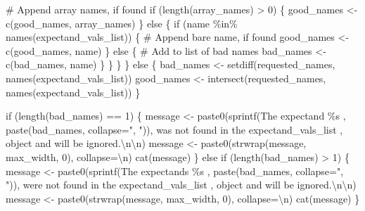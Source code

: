 \documentclass[
  letterpaper,
  DIV=11,
  numbers=noendperiod]{scrartcl}
\newenvironment{Shaded}{\begin{snugshade}}{\end{snugshade}}
\newcommand{\CharTok}[1]{\textcolor[rgb]{0.13,0.47,0.30}{#1}}
\newcommand{\CommentTok}[1]{\textcolor[rgb]{0.37,0.37,0.37}{#1}}
\newcommand{\ControlFlowTok}[1]{\textcolor[rgb]{0.00,0.23,0.31}{#1}}
\newcommand{\DecValTok}[1]{\textcolor[rgb]{0.68,0.00,0.00}{#1}}
\newcommand{\KeywordTok}[1]{\textcolor[rgb]{0.00,0.23,0.31}{#1}}
\newcommand{\NormalTok}[1]{\textcolor[rgb]{0.00,0.23,0.31}{#1}}
\newcommand{\OperatorTok}[1]{\textcolor[rgb]{0.37,0.37,0.37}{#1}}
\newcommand{\SpecialCharTok}[1]{\textcolor[rgb]{0.37,0.37,0.37}{#1}}
\newcommand{\StringTok}[1]{\textcolor[rgb]{0.13,0.47,0.30}{#1}}
\begin{document}
\begin{Shaded}
\begin{Highlighting}[]
      \CommentTok{\# Append array names, if found}
      \ControlFlowTok{if}\NormalTok{ (length(array\_names) }\OperatorTok{\textgreater{}} \DecValTok{0}\NormalTok{) \{}
\NormalTok{        good\_names }\OperatorTok{\textless{}{-}}\NormalTok{ c(good\_names, array\_names)}
\NormalTok{      \} }\ControlFlowTok{else}\NormalTok{ \{}
        \ControlFlowTok{if}\NormalTok{ (name }\OperatorTok{\%}\KeywordTok{in}\OperatorTok{\%}\NormalTok{ names(expectand\_vals\_list)) \{}
          \CommentTok{\# Append bare name, if found}
\NormalTok{          good\_names }\OperatorTok{\textless{}{-}}\NormalTok{ c(good\_names, name)}
\NormalTok{        \}  }\ControlFlowTok{else}\NormalTok{ \{}
          \CommentTok{\# Add to list of bad names}
\NormalTok{          bad\_names }\OperatorTok{\textless{}{-}}\NormalTok{ c(bad\_names, name)}
\NormalTok{        \}}
\NormalTok{      \}}
\NormalTok{    \}}
\NormalTok{  \} }\ControlFlowTok{else}\NormalTok{ \{}
\NormalTok{    bad\_names }\OperatorTok{\textless{}{-}}\NormalTok{ setdiff(requested\_names, names(expectand\_vals\_list))}
\NormalTok{    good\_names }\OperatorTok{\textless{}{-}}\NormalTok{ intersect(requested\_names, names(expectand\_vals\_list))}
\NormalTok{  \}}
    
  \ControlFlowTok{if}\NormalTok{ (length(bad\_names) }\OperatorTok{==} \DecValTok{1}\NormalTok{) \{}
\NormalTok{    message }\OperatorTok{\textless{}{-}}\NormalTok{ paste0(sprintf(}\StringTok{\textquotesingle{}The expectand }\SpecialCharTok{\%s}\StringTok{ \textquotesingle{}}\NormalTok{,}
\NormalTok{                              paste(bad\_names, collapse}\OperatorTok{=}\StringTok{", "}\NormalTok{)),}
                      \StringTok{\textquotesingle{}was not found in the expectand\_vals\_list \textquotesingle{}}\NormalTok{,}
                      \StringTok{\textquotesingle{}object and will be ignored.}\CharTok{\textbackslash{}n\textbackslash{}n}\StringTok{\textquotesingle{}}\NormalTok{)}
\NormalTok{    message }\OperatorTok{\textless{}{-}}\NormalTok{ paste0(strwrap(message, max\_width, }\DecValTok{0}\NormalTok{), collapse}\OperatorTok{=}\StringTok{\textquotesingle{}}\CharTok{\textbackslash{}n}\StringTok{\textquotesingle{}}\NormalTok{)}
\NormalTok{    cat(message)}
\NormalTok{  \} }\ControlFlowTok{else} \ControlFlowTok{if}\NormalTok{ (length(bad\_names) }\OperatorTok{\textgreater{}} \DecValTok{1}\NormalTok{) \{}
\NormalTok{    message }\OperatorTok{\textless{}{-}}\NormalTok{ paste0(sprintf(}\StringTok{\textquotesingle{}The expectands }\SpecialCharTok{\%s}\StringTok{ \textquotesingle{}}\NormalTok{,}
\NormalTok{                              paste(bad\_names, collapse}\OperatorTok{=}\StringTok{", "}\NormalTok{)),}
                      \StringTok{\textquotesingle{}were not found in the expectand\_vals\_list \textquotesingle{}}\NormalTok{,}
                      \StringTok{\textquotesingle{}object and will be ignored.}\CharTok{\textbackslash{}n\textbackslash{}n}\StringTok{\textquotesingle{}}\NormalTok{)}
\NormalTok{    message }\OperatorTok{\textless{}{-}}\NormalTok{ paste0(strwrap(message, max\_width, }\DecValTok{0}\NormalTok{), collapse}\OperatorTok{=}\StringTok{\textquotesingle{}}\CharTok{\textbackslash{}n}\StringTok{\textquotesingle{}}\NormalTok{)}
\NormalTok{    cat(message)}
\NormalTok{  \}}
  

\end{Highlighting}
\end{Shaded}
\end{document}
